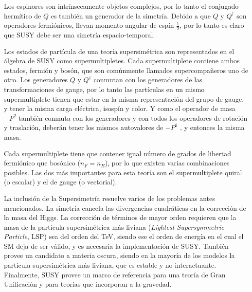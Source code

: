 Los espinores son intrínsecamente objetos complejos, por lo tanto el conjugado hermítico de $Q$ es también un generador de la simetría. Debido a que $Q$ y $Q^{\dagger}$ son operadores fermiónicos, llevan momento angular de espín $\frac{1}{2}$, por lo tanto es claro que SUSY debe ser una simetría espacio-temporal.

Los estados de partícula de una teoría supersimétrica son representados en el álgebra de SUSY como supermultipletes. Cada supermultiplete contiene ambos estados, fermión y bosón, que son comúnmente llamados supercompañeros uno de otro. Los generadores $Q$ y $Q^{\dagger}$ conmutan con los generadores de las transformaciones de gauge, por lo tanto las partículas en un mismo supermultiplete tienen que estar en la misma representación del grupo de gauge, y tener la misma carga eléctrica, isospín y color. Y como el operador de masa $-P^{2}$ también conmuta con los generadores y con todos los operadores de rotación y traslación, deberán tener los mismos autovalores de $-P^{2}$ , y entonces la misma masa.

Cada supermultiplete tiene que contener igual número de grados de libertad fermiónico que bosónico ($n_{F}=n_{B}$), por lo que existen varias combinaciones posibles. Las dos más importantes para esta teoría son el supermultiplete quiral (o escalar) y el de gauge (o vectorial).



La inclusión de la Supersimetría resuelve varios de los problemas antes mencionados. La simetría cancela las divergencias cuadráticas en la corrección de la masa del Higgs. La corrección de términos de mayor orden requieren que la masa de la partícula supersimétrica más liviana (\textit{Lightest Supersymmetric Particle}, LSP) sea del orden del TeV, siendo ese el orden de energía en el cual el SM deja de ser válido, y es necesaria la implementación de SUSY. También provee un candidato a materia oscura, siendo en la mayoría de los modelos la partícula supersimétrica más liviana, que es estable y no interactuante. Finalmente, SUSY provee un marco de referencia para una teoría de Gran Unificación y para teorías que incorporan a la gravedad. 



